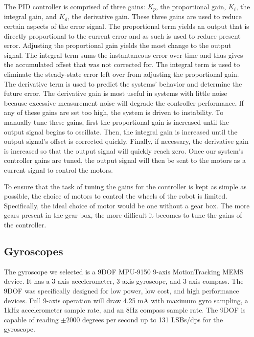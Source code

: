 \documentclass[11pt]{report}
\begin{document}
\begin{spacing}{1.5}
The PID controller is comprised of three gains: $K_p$, the proportional gain, $K_i$, the integral gain, and $K_d$, the derivative gain.  These three gains are used to reduce certain aspects of the error signal.  The proportional term yields an output that is directly proportional to the current error and as such is used to reduce present error.  Adjusting the proportional gain yields the most change to the output signal.  The integral term sums the instantaneous error over time and thus gives the accumulated offset that was not corrected for.  The integral term is used to eliminate the steady-state error left over from adjusting the proportional gain. The derivative term is used to predict the systems’ behavior and determine the future error.  The derivative gain is most useful in systems with little noise because excessive measurement noise will degrade the controller performance.   If any of these gains are set too high, the system is driven to instability.  To manually tune these gains, first the proportional gain is increased until the output signal begins to oscillate.  Then, the integral gain is increased until the output signal’s offset is corrected quickly.  Finally, if necessary, the derivative gain is increased so that the output signal will quickly reach zero.  Once our system’s controller gains are tuned, the output signal will then be sent to the motors as a current signal to control the motors.          
                                                                                                                                                                                                                                                                                                                                                                                                                                                                                               
To ensure that the task of tuning the gains for the controller is kept as simple as possible, the choice of motors to control the wheels of the robot is limited.  Specifically, the ideal choice of motor would be one without a gear box.  The more gears present in the gear box, the more difficult it becomes to tune the gains of the controller.

\subsection*{Gyroscopes}

The gyroscope we selected is a 9DOF MPU-9150 9-axis MotionTracking MEMS device.  It has a 3-axis accelerometer, 3-axis gyroscope, and 3-axis compass.  The 9DOF was specifically designed for low power, low cost, and high performance devices.  Full 9-axis operation will draw 4.25 mA with maximum gyro sampling, a 1kHz accelerometer sample rate, and an 8Hz compass sample rate.  The 9DOF is capable of reading $\pm2000$ degrees per second up to 131 LSBs/dps for the gyroscope.


\end{spacing}
\end{document}
